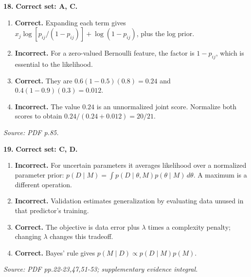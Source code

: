 \documentclass[11pt,a4paper]{article}
\begin{document}
\par\noindent\begin{minipage}{\linewidth}
\textbf{18.} \textbf{Correct set: A, C.}
\begin{enumerate}[label=(\Alph*),leftmargin=8mm,itemsep=2pt,topsep=2pt]
\item \textbf{Correct.} Expanding each term gives \(x_j\log[p_{ij}/(1-p_{ij})]+\log(1-p_{ij})\), plus the log prior.
\item \textbf{Incorrect.} For a zero-valued Bernoulli feature, the factor is \(1-p_{ij}\), which is essential to the likelihood.
\item \textbf{Correct.} They are \(0.6(1-0.5)(0.8)=0.24\) and \(0.4(1-0.9)(0.3)=0.012\).
\item \textbf{Incorrect.} The value \(0.24\) is an unnormalized joint score. Normalize both scores to obtain \(0.24/(0.24+0.012)=20/21\).
\end{enumerate}
{\footnotesize\textit{Source: PDF p.85.}}

\end{minipage}\par\vspace{3mm}
\par\noindent\begin{minipage}{\linewidth}
\textbf{19.} \textbf{Correct set: C, D.}
\begin{enumerate}[label=(\Alph*),leftmargin=8mm,itemsep=2pt,topsep=2pt]
\item \textbf{Incorrect.} For uncertain parameters it averages likelihood over a normalized parameter prior: \(p(D\mid M)=\int p(D\mid\theta,M)p(\theta\mid M)\,d\theta\). A maximum is a different operation.
\item \textbf{Incorrect.} Validation estimates generalization by evaluating data unused in that predictor's training.
\item \textbf{Correct.} The objective is data error plus \(\lambda\) times a complexity penalty; changing \(\lambda\) changes this tradeoff.
\item \textbf{Correct.} Bayes' rule gives \(p(M\mid D)\propto p(D\mid M)p(M)\).
\end{enumerate}
{\footnotesize\textit{Source: PDF pp.22-23,47,51-53; supplementary evidence integral.}}

\end{minipage}\par\vspace{3mm}
\end{document}
